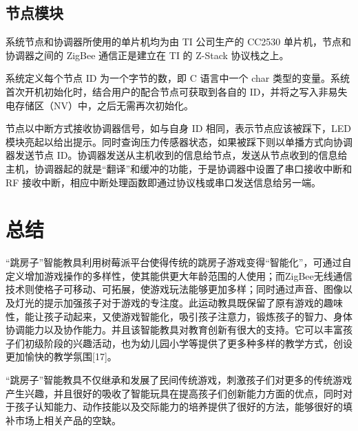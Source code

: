 \documentclass[a4paper,11pt,onecolumn,twoside]{article}
\begin{document}
\begin{spacing}{1.2}
 \subsection{节点模块}
    系统节点和协调器所使用的单片机均为由 TI 公司生产的 CC2530 单片机，节点和协调器之间的 ZigBee 通信正是建立在 TI 的 Z-Stack 协议栈之上。

    系统定义每个节点 ID 为一个字节的数，即 C 语言中一个 char 类型的变量。系统首次开机初始化时，结合用户的配合节点可获取到各自的 ID，并将之写入非易失电存储区（NV）中，之后无需再次初始化。

    节点以中断方式接收协调器信号，如与自身 ID 相同，表示节点应该被踩下，LED 模块亮起以给出提示。同时查询压力传感器状态，如果被踩下则以单播方式向协调器发送节点 ID。协调器发送从主机收到的信息给节点，发送从节点收到的信息给主机，协调器起的就是“翻译”和缓冲的功能，于是协调器中设置了串口接收中断和 RF 接收中断，相应中断处理函数即通过协议栈或串口发送信息给另一端。

\section{总结}
    “跳房子”智能教具利用树莓派平台使得传统的跳房子游戏变得“智能化”，可通过自定义增加游戏操作的多样性，使其能供更大年龄范围的人使用；而ZigBee无线通信技术则使格子可移动、可拓展，使游戏玩法能够更加多样；同时通过声音、图像以及灯光的提示加强孩子对于游戏的专注度。此运动教具既保留了原有游戏的趣味性，能让孩子动起来，又使游戏智能化，吸引孩子注意力，锻炼孩子的智力、身体协调能力以及协作能力。并且该智能教具对教育创新有很大的支持。它可以丰富孩子们初级阶段的兴趣活动，也为幼儿园小学等提供了更多种多样的教学方式，创设更加愉快的教学氛围[17]。

    “跳房子”智能教具不仅继承和发展了民间传统游戏，刺激孩子们对更多的传统游戏产生兴趣，并且很好的吸收了智能玩具在提高孩子们创新能力方面的优点，同时对于孩子认知能力、动作技能以及交际能力的培养提供了很好的方法，能够很好的填补市场上相关产品的空缺。

\end{spacing}
\end{document}
